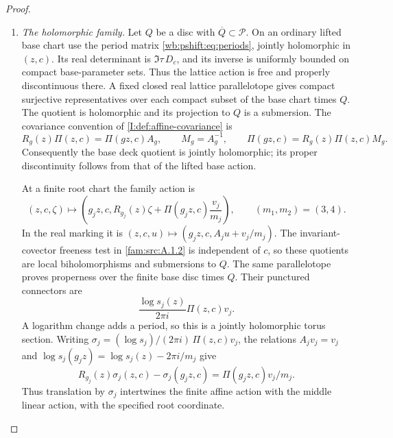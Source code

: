 \begin{proof}
\begin{enumerate}[label=\arabic*.,leftmargin=*]
\item \emph{The holomorphic family.}
Let $Q$ be a disc with $\overline Q\subset\mathcal P$.
On an ordinary lifted base chart use the period matrix
\eqref{wb:pshift:eq:periods}, jointly holomorphic in $(z,c)$.
Its real determinant is $\Im\tau\,D_c$, and its inverse is
uniformly bounded on compact base-parameter sets. Thus the lattice
action is free and properly discontinuous there. A fixed closed
real lattice parallelotope gives compact surjective representatives
over each compact subset of the base chart times $Q$.
The quotient is holomorphic and its projection to $Q$ is a submersion.
The covariance convention of \cref{I:def:affine-covariance} is
\[
 R_g(z)\Pi(z,c)=\Pi(gz,c)A_g,
 \qquad M_g=A_g^{-1},\qquad
 \Pi(gz,c)=R_g(z)\Pi(z,c)M_g.
\]
Consequently the base deck quotient is jointly holomorphic; its
proper discontinuity follows from that of the lifted base action.

At a finite root chart the family action is
\begin{equation}
 (z,c,\zeta)\longmapsto
 \left(g_jz,c,R_{g_j}(z)\zeta+
             \Pi(g_jz,c)\frac{v_j}{m_j}\right),
 \qquad (m_1,m_2)=(3,4).
\label{pub:I:eq:PD7}
\end{equation}
In the real marking it is $(z,c,u)\mapsto(g_jz,c,A_ju+v_j/m_j)$.
The invariant-covector freeness test in \cref{fam:src:A.1.2}
is independent of $c$, so these quotients are local biholomorphisms
and submersions to $Q$. The same parallelotope proves properness
over the finite base disc times $Q$. Their punctured connectors are
\begin{equation}
 \frac{\log s_j(z)}{2\pi i}\Pi(z,c)v_j.
\label{pub:I:eq:PD8}
\end{equation}
A logarithm change adds a period, so this is a jointly holomorphic
torus section. Writing $\sigma_j=(\log s_j)/(2\pi i)\,\Pi(z,c)v_j$, the
relations $A_jv_j=v_j$ and
$\log s_j(g_jz)=\log s_j(z)-2\pi i/m_j$ give
\[
 R_{g_j}(z)\sigma_j(z,c)-\sigma_j(g_jz,c)
       =\Pi(g_jz,c)v_j/m_j.
\]
Thus translation by $\sigma_j$ intertwines the finite affine action
with the middle linear action, with the specified root coordinate.


\end{enumerate}
\end{proof}
